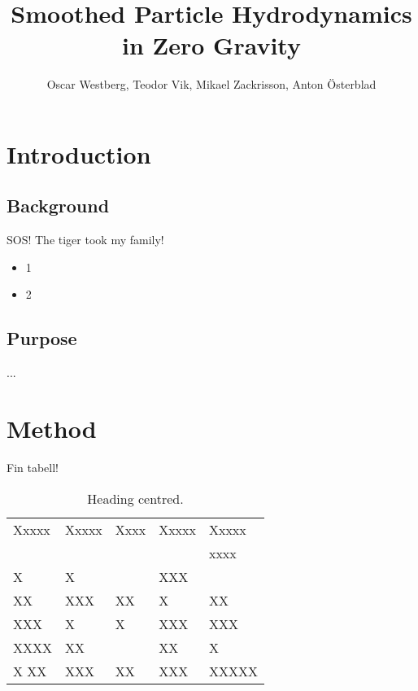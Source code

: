 \documentclass[a4paper,12pt,twoside]{report}
\begin{document}
\pagestyle{plain}


\title{Smoothed Particle Hydrodynamics in Zero Gravity}
\author{Oscar Westberg, Teodor Vik, Mikael Zackrisson, Anton Österblad}
\maketitle

\tableofcontents  %
\listoffigures    %
\listoftables     %



\chapter{Introduction}
\setcounter{page}{1}


\section{Background}

SOS!
The tiger took my family!

\begin{itemize}
\item 1
\item 2
\end{itemize}



\section{Purpose}

...


\chapter{Method}

Fin tabell!
\begin{table}[htbp]
  \caption{Heading centred.}
  \label{table_example}
  \begin{tabular*}{\hsize}{lllll}
\hline
Xxxxx & Xxxxx & Xxxx & Xxxxx & Xxxxx \\
      &       &      &       & xxxx  \\
\hline
X     & X     &      & XXX   &       \\
XX    & XXX   & XX   & X     & XX    \\
XXX   & X     & X    & XXX   & XXX   \\
XXXX  & XX    &      & XX    & X     \\
X XX  & XXX   & XX   & XXX   & XXXXX \\
\hline
  \end{tabular*}
\end{table}
\end{document}
